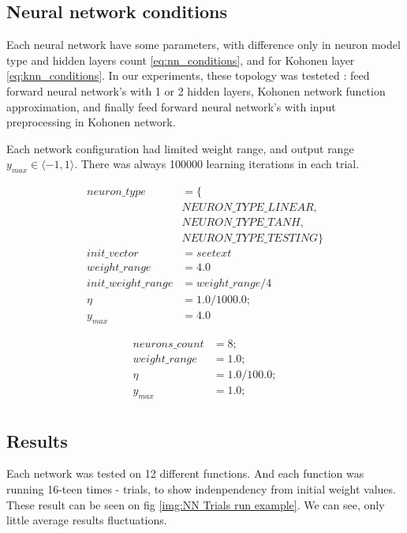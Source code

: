 \documentclass[times]{cpeauth}
\begin{document}
\subsection{Neural network conditions}
Each neural network have some parameters, with difference only in neuron model type
and hidden layers count \ref{eq:nn_conditions},  and for Kohonen layer \ref{eq:knn_conditions}. In our experiments,
these topology was testeted :
feed forward neural network's with 1 or 2 hidden layers, Kohonen network function approximation,
and finally feed forward neural network's with input preprocessing in Kohonen network.

Each network configuration had limited weight range, and output range $y_{max} \in \langle -1, 1 \rangle$.
There was always 100000 learning iterations in each trial.

\begin{align}
\label{eq:nn_conditions}
neuron\_type &= \{ \nonumber \\
                &NEURON\_TYPE\_LINEAR, \nonumber \\
                &NEURON\_TYPE\_TANH, \nonumber \\
                &NEURON\_TYPE\_TESTING \} \nonumber \\
init\_vector &= {see text} \nonumber \\
weight\_range &= 4.0 \nonumber \\
init\_weight\_range &= weight\_range/4 \nonumber \\
\eta &= 1.0/1000.0; \nonumber \\
y_{max} &= 4.0
\end{align}


\begin{align}
\label{eq:knn_conditions}
neurons\_count &= 8; \nonumber \\
weight\_range &= 1.0; \nonumber \\
\eta &= 1.0/100.0; \nonumber \\
y_{max} &= 1.0; \nonumber \\
\end{align}

\newpage
\subsection{Results}

Each network was tested on 12 different functions. And each function was running
16-teen times - trials, to show indenpendency from initial weight values. These
result can be seen on fig \ref{img:NN Trials run example}. We can see, only little average
results fluctuations.
\end{document}
